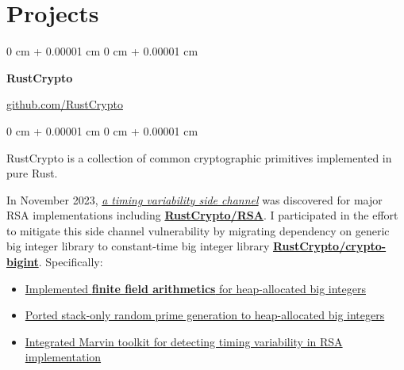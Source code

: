 \documentclass[10pt, letterpaper]{article}
\newenvironment{highlights}{
    \begin{itemize}[
        topsep=0.10 cm,
        parsep=0.10 cm,
        partopsep=0pt,
        itemsep=0pt,
        leftmargin=0 cm + 10pt
    ]
}{
    \end{itemize}
} %
\newenvironment{onecolentry}{
    \begin{adjustwidth}{
        0 cm + 0.00001 cm
    }{
        0 cm + 0.00001 cm
    }
}{
    \end{adjustwidth}
} %
\newenvironment{twocolentry}[2][]{
    \onecolentry
    \def\secondColumn{#2}
    \setcolumnwidth{\fill, 4.5 cm}
    \begin{paracol}{2}
}{
    \switchcolumn \raggedleft \secondColumn
    \end{paracol}
    \endonecolentry
} %
\begin{document}


    
    \section{Projects}
        \begin{twocolentry}
            {\href{https://github.com/RustCrypto}{github.com/RustCrypto}}
            {\textbf{RustCrypto}}
        \end{twocolentry}
        \vspace{0.1cm}
        \begin{onecolentry}
            RustCrypto is a collection of common cryptographic primitives implemented in pure Rust.
            \vspace{0.1cm}

            In November 2023, \href{https://people.redhat.com/~hkario/marvin/}{\emph{a timing variability side channel}} was discovered for major RSA implementations including \href{https://github.com/RustCrypto/RSA}{\textbf{RustCrypto/RSA}}. I participated in the effort to mitigate this side channel vulnerability by migrating dependency on generic big integer library to constant-time big integer library \href{https://github.com/RustCrypto/crypto-bigint}{\textbf{RustCrypto/crypto-bigint}}. Specifically:

            \begin{highlights}
                \item \href{https://github.com/RustCrypto/crypto-bigint/pulls?q=is%3Apr+is%3Aclosed+author%3Axuganyu96++is%3Amerged}{Implemented \textbf{finite field arithmetics} for heap-allocated big integers}
                \item \href{https://github.com/entropyxyz/crypto-primes/pull/40}{Ported stack-only random prime generation to heap-allocated big integers}
                \item \href{https://github.com/RustCrypto/RSA/pull/400}{Integrated Marvin toolkit for detecting timing variability in RSA implementation} 
            \end{highlights}
        \end{onecolentry}
        \vspace{0.2cm}
\end{document}
